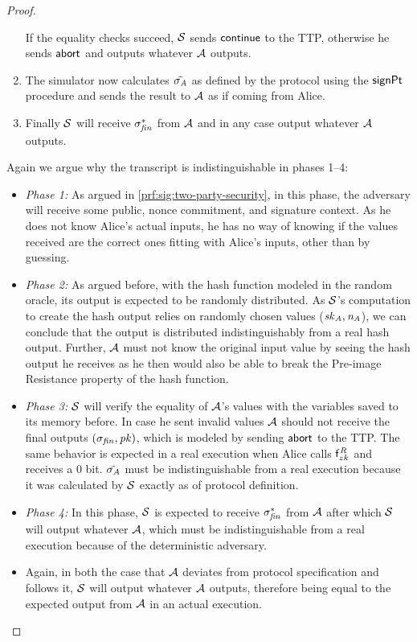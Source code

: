 \begin{proof}
\begin{enumerate}
        If the equality checks succeed, $\mathcal{S}$ sends $\mathsf{continue}$ to the TTP, otherwise he sends $\mathsf{abort}$ and outputs whatever $\mathcal{A}$ outputs.
        \item The simulator now calculates $\tilde{\sigma_{\mathit{A}}}$ as defined by the protocol using the $\mathsf{signPt}$ procedure and sends the result to $\mathcal{A}$ as if coming from Alice.
        \item Finally $\mathcal{S}$ will receive $\sigma_{\mathit{fin}}^*$ from $\mathcal{A}$ and in any case output whatever $\mathcal{A}$ outputs.
    \end{enumerate}
    
    Again we argue why the transcript is indistinguishable in phases 1--4:
    \begin{itemize}
        \item \textit{Phase 1:} As argued in \cref{prf:sig:two-party-security}, in this phase, the adversary will receive some public, nonce commitment, and signature context.
        As he does not know Alice's actual inputs, he has no way of knowing if the values received are the correct ones fitting with Alice's inputs, other than by guessing.
        \item \textit{Phase 2:} As argued before, with the hash function modeled in the random oracle, its output is expected to be randomly distributed.
        As $\mathcal{S}$'s computation to create the hash output relies on randomly chosen values ($\mathit{sk}_{\mathit{A}}, \mathit{\mathit{n}_{\mathit{A}}}$), we can conclude that the output is distributed indistinguishably from a real hash output.
        Further, $\mathcal{A}$ must not know the original input value by seeing the hash output he receives as he then would also be able to break the Pre-image Resistance property of the hash function.
        \item \textit{Phase 3:} $\mathcal{S}$ will verify the equality of $\mathcal{A}$'s values with the variables saved to its memory before.
        In case he sent invalid values $\mathcal{A}$ should not receive the final outputs $(\sigma_{\mathit{fin}}, \mathit{pk})$, which is modeled by sending $\mathsf{abort}$ to the TTP.
        The same behavior is expected in a real execution when Alice calls $\mathsf{f}^{\mathit{R}}_{zk}$ and receives a 0 bit.
        $\tilde{\sigma_{\mathit{A}}}$ must be indistinguishable from a real execution because it was calculated by $\mathcal{S}$ exactly as of protocol definition.
        \item \textit{Phase 4:} In this phase, $\mathcal{S}$ is expected to receive $\sigma_{\mathit{fin}}^*$ from $\mathcal{A}$ after which $\mathcal{S}$ will output whatever $\mathcal{A}$, which must be indistinguishable from a real execution because of the deterministic adversary.
        \item Again, in both the case that $\mathcal{A}$ deviates from protocol specification and follows it, $\mathcal{S}$ will output whatever $\mathcal{A}$ outputs, therefore being equal to the expected output from $\mathcal{A}$ in an actual execution.
    \end{itemize}


\end{proof}
